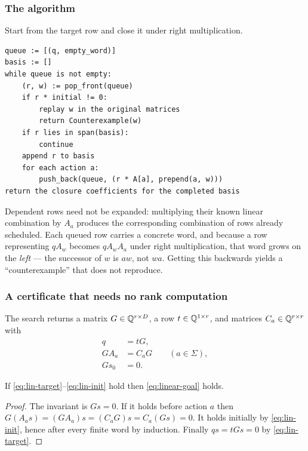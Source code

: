 \subsubsection*{The algorithm}

Start from the target row and close it under right multiplication.

\begin{lstlisting}
queue := [(q, empty_word)]
basis := []
while queue is not empty:
    (r, w) := pop_front(queue)
    if r * initial != 0:
        replay w in the original matrices
        return Counterexample(w)
    if r lies in span(basis):
        continue
    append r to basis
    for each action a:
        push_back(queue, (r * A[a], prepend(a, w)))
return the closure coefficients for the completed basis
\end{lstlisting}

Dependent rows need not be expanded: multiplying their known linear combination
by $A_a$ produces the corresponding combination of rows already scheduled. Each
queued row carries a concrete word, and because a row representing $qA_w$
becomes $qA_wA_a$ under right multiplication, that word grows on the \emph{left}
--- the successor of $w$ is $aw$, not $wa$. Getting this backwards yields a
``counterexample'' that does not reproduce.

\subsubsection*{A certificate that needs no rank computation}

The search returns a matrix $G\in\mathbb{Q}^{r\times D}$, a row $t\in\mathbb{Q}^{1\times r}$,
and matrices $C_a\in\mathbb{Q}^{r\times r}$ with
\begin{align}
 q&=tG, \label{eq:lin-target}\\
 GA_a&=C_aG \qquad (a\in\Sigma), \label{eq:lin-closure}\\
 Gs_0&=0. \label{eq:lin-init}
\end{align}

\begin{theorem}
\label{thm:linear-sound}
If \eqref{eq:lin-target}--\eqref{eq:lin-init} hold then \eqref{eq:linear-goal}
holds.
\end{theorem}
\begin{proof}
The invariant is $Gs=0$. If it holds before action $a$ then
$G(A_as)=(GA_a)s=(C_aG)s=C_a(Gs)=0$. It holds initially by
\eqref{eq:lin-init}, hence after every finite word by induction. Finally
$qs=tGs=0$ by \eqref{eq:lin-target}.
\end{proof}

